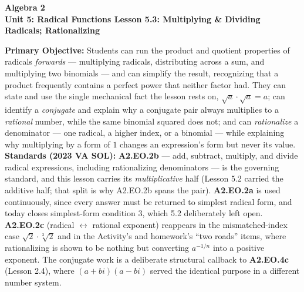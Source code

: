 \documentclass[10pt]{article}
\newcommand{\CourseName}{Algebra 2}
\newcommand{\UnitNumberName}{Unit 5: Radical Functions \quad}
\newcommand{\LessonNumberName}{Lesson 5.3: Multiplying \& Dividing Radicals; Rationalizing}
\begin{document}
\begin{center}
    {\Large\bfseries \CourseName \\
    {\small\bfseries \UnitNumberName \LessonNumberName}}
\end{center}

\begin{tcolorbox}[colback=forestbg, colframe=forest, boxrule=0.9pt, arc=2mm,
    left=2mm, right=2mm, top=1.5mm, bottom=1.5mm]
    \textbf{Primary Objective:} Students can run the product and quotient properties of radicals
    \emph{forwards} --- multiplying radicals, distributing across a sum, and multiplying two
    binomials --- and can simplify the result, recognizing that a product frequently contains a
    perfect power that neither factor had. They can state and use the single mechanical fact the
    lesson rests on, $\sqrt{a}\cdot\sqrt{a}=a$; can identify a \emph{conjugate} and explain why a
    conjugate pair always multiplies to a \emph{rational} number, while the same binomial squared
    does not; and can \emph{rationalize} a denominator --- one radical, a higher index, or a
    binomial --- while explaining why multiplying by a form of $1$ changes an expression's form but
    never its value.
    \\[2pt]
    \textbf{Standards (2023 VA SOL):} \textbf{A2.EO.2b} --- add, subtract, multiply, and divide
    radical expressions, including rationalizing denominators --- is the governing standard, and
    this lesson carries its \emph{multiplicative} half (Lesson 5.2 carried the additive half; that
    split is why A2.EO.2b spans the pair). \textbf{A2.EO.2a} is used continuously, since every
    answer must be returned to simplest radical form, and today closes simplest-form condition 3,
    which 5.2 deliberately left open. \textbf{A2.EO.2c} (radical $\leftrightarrow$ rational
    exponent) reappears in the mismatched-index case $\sqrt2\cdot\sqrt[3]2$ and in the Activity's
    and homework's ``two roads'' items, where rationalizing is shown to be nothing but converting
    $a^{-1/n}$ into a positive exponent. The conjugate work is a deliberate structural callback to
    \textbf{A2.EO.4c} (Lesson 2.4), where $(a+bi)(a-bi)$ served the identical purpose in a
    different number system.
\end{tcolorbox}
\end{document}
